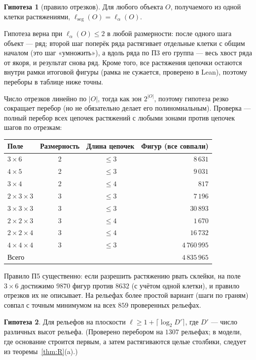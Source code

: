 \documentclass[11pt,a4paper]{article}
\theoremstyle{plain}
\theoremstyle{definition}
\newtheorem{conjecture}{Гипотеза}
\theoremstyle{remark}
\begin{document}
\begin{conjecture}[правило отрезков]\label{conj:seg}
Для любого объекта $O$, получаемого из одной клетки растяжениями, $\ell_{\mathrm{seg}}(O)=\ell_\alpha(O)$.
\end{conjecture}

Гипотеза верна при $\ell_\alpha(O)\le2$ в любой размерности: после одного шага объект — ряд; второй шаг поперёк ряда растягивает отдельные клетки с общим началом (это шаг «умножить»), а вдоль ряда по П3 его группа — весь хвост ряда от якоря, и результат снова ряд. Кроме того, все растяжения цепочки остаются внутри рамки итоговой фигуры (рамка не сужается, проверено в Lean), поэтому переборы в таблице ниже точны.

Число отрезков линейно по $|O|$, тогда как зон $2^{|O|}$, поэтому гипотеза резко сокращает перебор (но не обязательно делает его полиномиальным). Проверка — полный перебор всех цепочек растяжений с любыми зонами против цепочек шагов по отрезкам:

\begin{center}
\begin{tabular}{lccr}
\toprule
Поле & Размерность & Длина цепочек & Фигур (все совпали)\\
\midrule
$3\times6$ & 2 & $\le3$ & $8\,631$\\
$4\times5$ & 2 & $\le3$ & $9\,031$\\
$3\times4$ & 2 & $\le4$ & $817$\\
$2\times3\times3$ & 3 & $\le3$ & $7\,196$\\
$3\times3\times3$ & 3 & $\le3$ & $30\,893$\\
$2\times2\times3$ & 3 & $\le4$ & $1\,670$\\
$2\times2\times4$ & 3 & $\le4$ & $16\,732$\\
$4\times4\times4$ & 3 & $\le3$ & $4\,760\,995$\\
\midrule
Всего & & & $4\,835\,965$\\
\bottomrule
\end{tabular}
\end{center}

Правило П5 существенно: если разрешить растяжению рвать склейки, на поле $3\times6$ достижимо $9870$ фигур против $8632$ (с учётом одной клетки), и правило отрезков их не описывает. На рельефах более простой вариант (шаги по граням) совпал с точным минимумом на всех $859$ проверенных рельефах.

\begin{conjecture}
Для рельефов на плоскости $\ell\ge1+\lceil\log_2 D'\rceil$, где $D'$ — число различных высот рельефа. (Проверено перебором на $1307$ рельефах; в модели, где основание строится первым, а затем растягиваются целые столбики, следует из теоремы~\ref{thm:R}(a).)
\end{conjecture}
\end{document}
